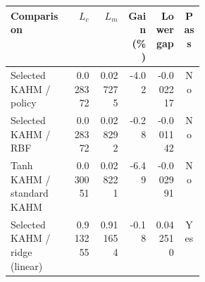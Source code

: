 \begin{tabular}{@{}p{0.32\linewidth}rrrrc@{}}
\toprule
Comparison & $L_c$ & $L_m$ & Gain (\%) & Lower gap & Pass \\
\midrule
Selected KAHM / policy & 0.028372 & 0.027275 & -4.02 & -0.002217 & No \\
Selected KAHM / RBF & 0.028372 & 0.028292 & -0.28 & -0.001142 & No \\
Tanh KAHM / standard KAHM & 0.030051 & 0.028221 & -6.49 & -0.002991 & No \\
Selected KAHM / ridge (linear) & 0.913255 & 0.911654 & -0.18 & 0.042510 & Yes \\
\bottomrule
\end{tabular}
